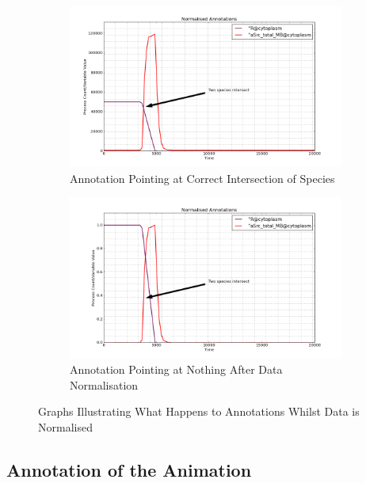 \begin{figure}[h!]
    \centering
    \begin{subfigure}[b]{0.6\textwidth}
        \centering
        \includegraphics[width=\textwidth]{images/unnormalised_annotation.png}
        \caption{Annotation Pointing at Correct Intersection of Species}
        \label{fig:distance_scale_a}
    \end{subfigure}

    \begin{subfigure}[b]{0.6\textwidth}
        \centering
        \includegraphics[width=\textwidth]{images/normalised_annotation.png}
        \caption{Annotation Pointing at Nothing After Data Normalisation}
        \label{fig:distance_scale_b}
    \end{subfigure}
    \caption{Graphs Illustrating What Happens to Annotations Whilst Data is Normalised}
    \label{fig:distance_scale}
\end{figure}

\subsection{Annotation of the Animation}

